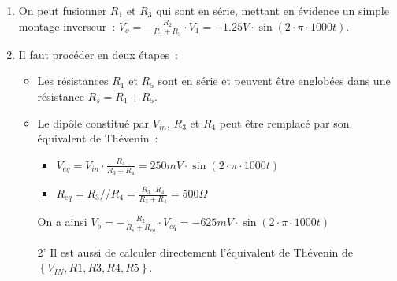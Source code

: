\documentclass{../template/tp}
\begin{document}
{
	\begin{enumerate}
		\item On peut fusionner $R_1$ et $R_3$ qui sont en série, mettant en évidence un simple montage inverseur~: $V_o = - \frac{R_2}{R_1 + R_3} \cdot V_1 = - 1.25 V \cdot \sin(2\cdot \pi \cdot 1000 t)$.

		\item Il faut procéder en deux étapes~:
		\begin{itemize}
			\item Les résistances $R_1$ et $R_5$ sont en série et peuvent être englobées dans une résistance $R_s = R_1 + R_5$.
			\item Le dipôle constitué par $V_{in}$, $R_3$ et $R_4$ peut être remplacé par son équivalent de Thévenin~:
			\begin{itemize}
				\item $V_{eq} = V_{in} \cdot \frac{R_4}{R_3 + R_4} = 250 mV \cdot \sin(2\cdot \pi \cdot 1000 t)$
				\item $R_{eq} = R_3 // R_4 = \frac{R_3 \cdot R_4}{R_3 + R_4} = 500 \Omega$
			\end{itemize}

		On a ainsi $V_o = -\frac{R_2}{R_s + R_{eq}} \cdot V_{eq} = - 625 mV \cdot \sin(2\cdot \pi \cdot 1000 t)$
		\item [2'] Il est aussi de calculer directement l'équivalent de Thévenin de $\left\lbrace V_{IN}, R1, R3, R4, R5 \right\rbrace$.
		\end{itemize}
	\end{enumerate}

}
\end{document}
